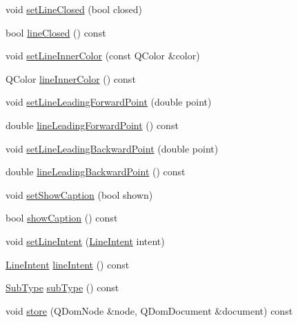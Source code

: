 \begin{DoxyCompactItemize}
\item 
void \hyperlink{classOkular_1_1LineAnnotation_a7a48ad13b37252c75d3bbab59393a941}{set\+Line\+Closed} (bool closed)
\item 
bool \hyperlink{classOkular_1_1LineAnnotation_a5d2d587e08762b48ded428be2e390e79}{line\+Closed} () const 
\item 
void \hyperlink{classOkular_1_1LineAnnotation_ae5959ad2b144411d304ff790805f65ab}{set\+Line\+Inner\+Color} (const Q\+Color \&color)
\item 
Q\+Color \hyperlink{classOkular_1_1LineAnnotation_a240bcd7154afdf61c526295134abdc0f}{line\+Inner\+Color} () const 
\item 
void \hyperlink{classOkular_1_1LineAnnotation_ae91d934170b3ffd0b488c6a646a31e4e}{set\+Line\+Leading\+Forward\+Point} (double point)
\item 
double \hyperlink{classOkular_1_1LineAnnotation_a5ea35b2ee68172d9cf183d8778e34edb}{line\+Leading\+Forward\+Point} () const 
\item 
void \hyperlink{classOkular_1_1LineAnnotation_a1990502f6bd88b4c95955003ce7af9b0}{set\+Line\+Leading\+Backward\+Point} (double point)
\item 
double \hyperlink{classOkular_1_1LineAnnotation_a6a492d6aadd6d9ee879f85c5f24e99a0}{line\+Leading\+Backward\+Point} () const 
\item 
void \hyperlink{classOkular_1_1LineAnnotation_af27c01909eef564d933c8f52e2595893}{set\+Show\+Caption} (bool shown)
\item 
bool \hyperlink{classOkular_1_1LineAnnotation_a29a1ebda3306c7a928c6f94e160cb9de}{show\+Caption} () const 
\item 
void \hyperlink{classOkular_1_1LineAnnotation_a98227f37b08a003692b50823ef3e5feb}{set\+Line\+Intent} (\hyperlink{classOkular_1_1LineAnnotation_a80458e2d982d5ef91ff18b850b34489f}{Line\+Intent} intent)
\item 
\hyperlink{classOkular_1_1LineAnnotation_a80458e2d982d5ef91ff18b850b34489f}{Line\+Intent} \hyperlink{classOkular_1_1LineAnnotation_a32833faa92a3f7ea334b6a83ff23a36a}{line\+Intent} () const 
\item 
\hyperlink{classOkular_1_1Annotation_af71b46e37d5f850b97d5c4de3be9aac0}{Sub\+Type} \hyperlink{classOkular_1_1LineAnnotation_a4502f6dbe224d26f8731d0e27356398b}{sub\+Type} () const 
\item 
void \hyperlink{classOkular_1_1LineAnnotation_a713c4eeec6a438cc355d8df415293dad}{store} (Q\+Dom\+Node \&node, Q\+Dom\+Document \&document) const 
\end{DoxyCompactItemize}


